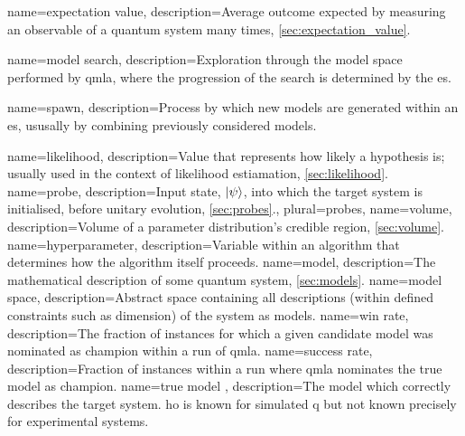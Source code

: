 


{
    name=expectation value,
    description={Average outcome expected by measuring an observable of a quantum system many times, \cref{sec:expectation_value}.}
}

{
    name=model search,
    description={Exploration through the \gls{model space} performed by \acrshort{qmla}, where the progression of the search is determined by the \acrshort{es}.}
}

{
    name=spawn,
    description={Process by which new models are generated within an \acrshort{es}, ususally by combining previously considered models.}
}

{
    name=likelihood,
    description={Value that represents how likely a hypothesis is; usually used in the context of likelihood estiamation, \cref{sec:likelihood}.}
}
{
    name=probe,
    description={Input state, $\ket{\psi}$, into which the target system is initialised, before unitary evolution, \cref{sec:probes}.},
    plural={probes},
}
{
    name=volume,
    description={Volume of a parameter distribution's credible region, \cref{sec:volume}.}
}
{
    name=hyperparameter,
    description={Variable within an algorithm that determines how the algorithm itself proceeds.}
}
{
    name=model,
    description={The mathematical description of some quantum system, \cref{sec:models}.}
}
{
    name=model space,
    description={Abstract space containing all descriptions (within defined constraints such as dimension) of the system as \glspl{model}.}
}
{
    name=win rate,
    description={The fraction of \glspl{instance} for which a given candidate \gls{model} was nominated as \gls{champion}
        within a \gls{run} of \acrshort{qmla}.
    }
}
{
    name=success rate,
    description={Fraction of \glspl{instance} within a \gls{run} where \acrshort{qmla} nominates the \gls{true model} as \gls{champion}.}
}
{
    name={true model} ,
    description={The model which correctly describes the target system. 
        \gls{ho} is known for simulated \gls{q} but not known precisely for experimental systems.
    }
}

